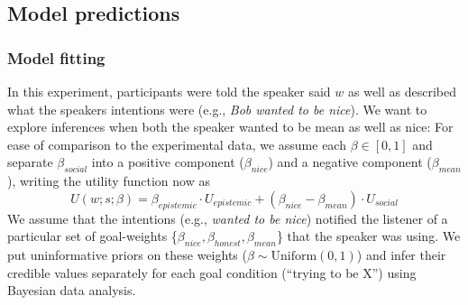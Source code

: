 \documentclass[10pt,letterpaper]{article}
\begin{document}
\subsection{Model predictions}


\subsubsection{Model fitting}

In this experiment, participants were told the speaker said $w$ as well as described what the speakers intentions were (e.g., \emph{Bob wanted to be nice}).
We want to explore inferences when both the speaker wanted to be mean as well as nice: For ease of comparison to the experimental data, we assume each $\beta \in [0,1]$ and separate $\beta_{social}$ into a positive component ($\beta_{nice}$) and a negative component ($\beta_{mean}$), writing the utility function now as
$$
 U(w;s; \beta)  =  \beta_{epistemic}\cdot U_{epistemic} + (\beta_{nice} - \beta_{mean}) \cdot U_{social}
 $$
We assume that the intentions (e.g., \emph{wanted to be nice}) notified the listener of a particular set of goal-weights \{$\beta_{nice}, \beta_{honest}, \beta_{mean}$\} that the speaker was using.
We put uninformative priors on these weights ($\beta \sim \text{Uniform}(0,1)$) and infer their credible values separately for each goal condition (``trying to be X'') using Bayesian data analysis.
\end{document}
